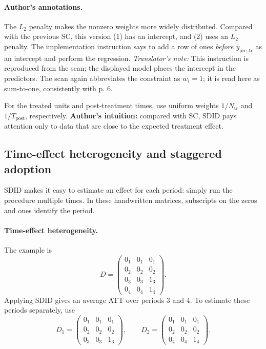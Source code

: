 \paragraph{Author's annotations.}
The \(L_2\) penalty makes the nonzero weights more widely distributed. Compared with the previous SC, this version (1) has an intercept, and (2) uses an \(L_2\) penalty. The implementation instruction says to add a row of ones \emph{before \(\overline y_{\mathrm{pre,tr}}\)} as an intercept and perform the regression.
\textit{Translator's note:} This instruction is reproduced from the scan; the displayed model places the intercept in the predictors. The scan again abbreviates the constraint as \(w_i=1\); it is read here as sum-to-one, consistently with p. 6.

For the treated units and post-treatment times, use uniform weights \(1/N_{\mathrm{tr}}\) and \(1/T_{\mathrm{post}}\), respectively. \textbf{Author's intuition:} compared with SC, SDID pays attention only to data that are close to the expected treatment effect.

\subsection{Time-effect heterogeneity and staggered adoption}
SDID makes it easy to estimate an effect for each period: simply run the procedure multiple times. In these handwritten matrices, subscripts on the zeros and ones identify the period.
\paragraph{Time-effect heterogeneity.}
The example is
\[
D=\begin{pmatrix}
0_1&0_1&0_1\\0_2&0_2&0_2\\0_3&0_3&1_3\\0_4&0_4&1_4
\end{pmatrix}.
\]
Applying SDID gives an average ATT over periods 3 and 4. To estimate these periods separately, use
\[
D_1=\begin{pmatrix}0_1&0_1&0_1\\0_2&0_2&0_2\\0_3&0_3&1_3\end{pmatrix},
\qquad
D_2=\begin{pmatrix}0_1&0_1&0_1\\0_2&0_2&0_2\\0_4&0_4&1_4\end{pmatrix}.
\]

